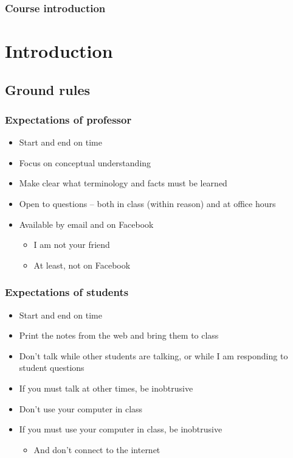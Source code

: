 \documentclass{beamer}
\begin{document}
\begin{frame}


\frametitle{Course introduction}\tableofcontents[hideallsubsections]
\end{frame}


 \section{Introduction }

 \subsection{Ground rules}
\begin{frame}


\frametitle{Expectations of professor}\begin{itemize}

\item Start and end on time

\item Focus on conceptual understanding

\item Make clear what terminology and facts must be learned

\item Open to questions -- both in class (within reason) and at office
	hours

\item Available by email and on Facebook\begin{itemize}

\item I am not your friend

\item At least, not on Facebook\end{itemize}\end{itemize}
\end{frame}

\begin{frame}


\frametitle{Expectations of students}\begin{itemize}

\item Start and end on time

\item Print the notes from the web and bring them to class

\item Don't talk while other students are talking, or while I am
	responding to student questions

\item If you must talk at other times, be inobtrusive

\item Don't use your computer in class

\item If you must use your computer in class, be inobtrusive\begin{itemize}

\item And don't connect to the internet\end{itemize}\end{itemize}
\end{frame}
\end{document}
